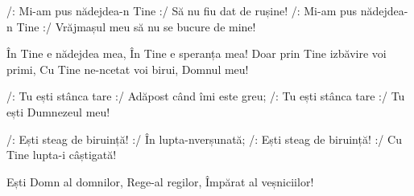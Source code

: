\beginverse
/: Mi-am pus nădejdea-n Tine :/
Să nu fiu dat de rușine!
/: Mi-am pus nădejdea-n Tine :/
Vrăjmașul meu să nu se bucure de mine!
\endverse

\beginchorus
În Tine e nădejdea mea,
În Tine e speranța mea!
Doar prin Tine izbăvire voi primi,
Cu Tine ne-ncetat voi birui,
Domnul meu!
\endchorus

\beginverse
/: Tu ești stânca tare :/
Adăpost când îmi este greu;
/: Tu ești stânca tare :/
Tu ești Dumnezeul meu!
\endverse

\beginverse
/: Ești steag de biruință! :/
În lupta-nverșunată;
/: Ești steag de biruință! :/
Cu Tine lupta-i câștigată!
\endverse

\beginverse*
Ești Domn al domnilor,
Rege-al regilor,
Împărat al veșniciilor!
\endverse
\endsong